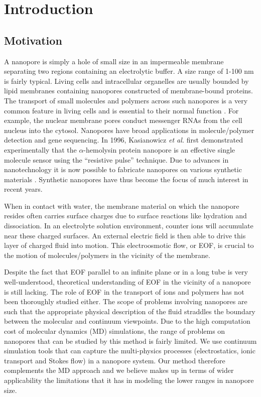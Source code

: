 \chapter{Introduction\label{chpt:intro}}
\section{Motivation}
\label{sec:intro-motiv}
A nanopore is simply a hole of small size in an impermeable membrane separating two regions containing an electrolytic buffer. A size range of 1-100 nm is fairly typical. Living cells and intracellular organelles are usually bounded by lipid membranes containing nanopores constructed of membrane-bound proteins. The transport of small molecules and polymers across such nanopores is a very common feature in living cells and is essential to their normal function \cite{Alberts,Pfanner_90,Matouschek,Martin,Kunkele}. For example, the nuclear membrane pores conduct messenger RNAs from the cell nucleus into the cytosol. Nanopores have broad applications in molecule\//polymer detection and gene sequencing. In 1996,  Kasianowicz \cite{Kasianowicz1996} {\it et al.} first demonstrated experimentally that the $\alpha$-hemolysin protein nanopore is an effective single molecule sensor  using the ``resistive pulse'' technique. Due to advances in nanotechnology it is now possible to fabricate nanopores on various synthetic materials \cite{li_nat_mat03,storm_physRevE05,storm_nanolett05,dekker_nano_lett06,bayley_nanotechnology_2010,Garaj2010,Schneider2010,Merchant2010} . Synthetic nanopores have thus become the focus of much interest in recent years.

When in contact with water, the membrane material on which the nanopore resides often carries surface charges due to surface reactions like hydration and dissociation. In an electrolyte solution environment, counter ions will accumulate near these charged surfaces. An external electric field is then able to drive this layer of charged fluid into motion. This electroosmotic flow, or EOF, is crucial to the motion of molecules\//polymers in the vicinity of the membrane. 

Despite the fact that EOF parallel to an infinite plane or in a long tube is very well-understood, theoretical understanding of EOF in the vicinity of a nanopore is still lacking. The role of EOF in the transport of ions and polymers has not been thoroughly studied either. The scope of problems involving nanopores are such that the appropriate physical description of the fluid straddles the boundary between the molecular and continuum viewpoints. Due to the high computation cost of molecular dynamics (MD) simulations, the range of problems on nanopores that can be studied by this method is fairly limited. We use continuum simulation tools that can capture the multi-physics processes (electrostatics, ionic transport and Stokes flow) in a nanopore system. Our method therefore complements the MD approach and we believe makes up in terms of wider applicability the limitations that it has in modeling the lower ranges in nanopore size. 

